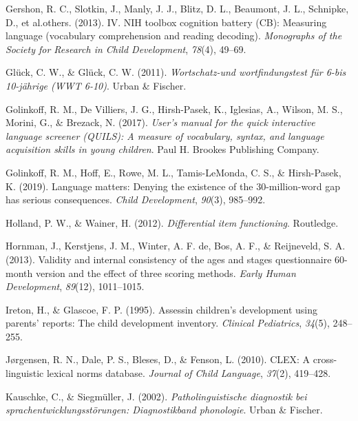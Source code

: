 \documentclass[
  man,floatsintext]{apa6}
\newlength{\cslhangindent}
\newlength{\cslentryspacingunit} %
\newenvironment{CSLReferences}[2] %
 {%
  \setlength{\parindent}{0pt}
  \ifodd #1
  \let\oldpar\par
  \def\par{\hangindent=\cslhangindent\oldpar}
  \fi
  \setlength{\parskip}{#2\cslentryspacingunit}
 }%
 {}
\begin{document}
\begin{CSLReferences}{1}{0}
\leavevmode{}%
Gershon, R. C., Slotkin, J., Manly, J. J., Blitz, D. L., Beaumont, J. L., Schnipke, D., et al.others. (2013). IV. NIH toolbox cognition battery (CB): Measuring language (vocabulary comprehension and reading decoding). \emph{Monographs of the Society for Research in Child Development}, \emph{78}(4), 49--69.

\leavevmode{}%
Glück, C. W., \& Glück, C. W. (2011). \emph{Wortschatz-und wortfindungstest f{ü}r 6-bis 10-j{ä}hrige (WWT 6-10)}. Urban \& Fischer.

\leavevmode{}%
Golinkoff, R. M., De Villiers, J. G., Hirsh-Pasek, K., Iglesias, A., Wilson, M. S., Morini, G., \& Brezack, N. (2017). \emph{User's manual for the quick interactive language screener (QUILS): A measure of vocabulary, syntax, and language acquisition skills in young children}. Paul H. Brookes Publishing Company.

\leavevmode{}%
Golinkoff, R. M., Hoff, E., Rowe, M. L., Tamis-LeMonda, C. S., \& Hirsh-Pasek, K. (2019). Language matters: Denying the existence of the 30-million-word gap has serious consequences. \emph{Child Development}, \emph{90}(3), 985--992.

\leavevmode{}%
Holland, P. W., \& Wainer, H. (2012). \emph{Differential item functioning}. Routledge.

\leavevmode{}%
Hornman, J., Kerstjens, J. M., Winter, A. F. de, Bos, A. F., \& Reijneveld, S. A. (2013). Validity and internal consistency of the ages and stages questionnaire 60-month version and the effect of three scoring methods. \emph{Early Human Development}, \emph{89}(12), 1011--1015.

\leavevmode{}%
Ireton, H., \& Glascoe, F. P. (1995). Assessin children's development using parents' reports: The child development inventory. \emph{Clinical Pediatrics}, \emph{34}(5), 248--255.

\leavevmode{}%
Jørgensen, R. N., Dale, P. S., Bleses, D., \& Fenson, L. (2010). CLEX: A cross-linguistic lexical norms database. \emph{Journal of Child Language}, \emph{37}(2), 419--428.

\leavevmode{}%
Kauschke, C., \& Siegmüller, J. (2002). \emph{Patholinguistische diagnostik bei sprachentwicklungsst{ö}rungen: Diagnostikband phonologie}. Urban \& Fischer.


\end{CSLReferences}
\end{document}
